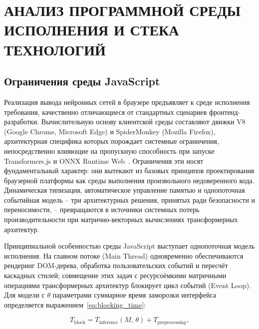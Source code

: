 \chapter{АНАЛИЗ ПРОГРАММНОЙ СРЕДЫ ИСПОЛНЕНИЯ И СТЕКА ТЕХНОЛОГИЙ} \label{ch:анализ_программной_среды_исполнения_и_стека_технологий}

\section{Ограничения среды JavaScript} \label{sec:ограничения_среды_javascript}

Реализация вывода нейронных сетей в браузере предъявляет к среде исполнения требования, качественно отличающиеся от стандартных сценариев фронтенд-разработки. Вычислительную основу клиентской среды составляют движки V8 (Google Chrome, Microsoft Edge) и SpiderMonkey (Mozilla Firefox), архитектурная специфика которых порождает системные ограничения, непосредственно влияющие на пропускную способность при запуске Transformers.js и ONNX Runtime Web~\cite{wang2024anatomizing}. Ограничения эти носят фундаментальный характер: они вытекают из базовых принципов проектирования браузерной платформы как среды выполнения произвольного недоверенного кода. Динамическая типизация, автоматическое управление памятью и однопоточная событийная модель – три архитектурных решения, принятых ради безопасности и переносимости, – превращаются в источники системных потерь производительности при матрично-векторных вычислениях трансформерных архитектур.

Принципиальной особенностью среды JavaScript выступает однопоточная модель исполнения. На главном потоке (Main Thread) одновременно обеспечиваются рендеринг DOM-дерева, обработка пользовательских событий и пересчёт каскадных стилей; совмещение этих задач с ресурсоёмкими матричными операциями трансформерных архитектур блокирует цикл событий (Event Loop). Для модели с $\theta$ параметрами суммарное время заморозки интерфейса определяется выражением~\eqref{eq:blocking_time}:

\begin{equation}
    T_{\text{block}} = T_{\text{inference}}(M,\,\theta) + T_{\text{preprocessing}},
    \label{eq:blocking_time}
\end{equation}

